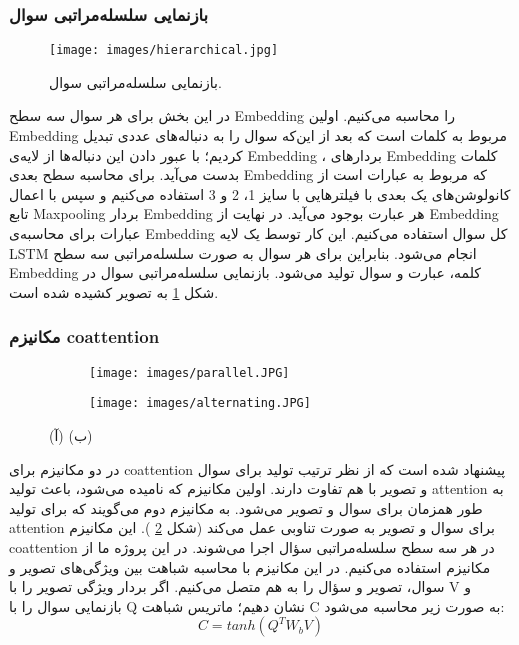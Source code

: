 {{		\subsubsection{بازنمایی سلسله‌مراتبی سوال}
		{
			\begin{figure}[h]
				\centering
				\texttt{[image: images/hierarchical.jpg]}
				\caption{بازنمایی سلسله‌مراتبی سوال.}
				\label{fig:4}
			\end{figure}
		
			در این بخش برای هر سوال سه سطح Embedding را محاسبه می‌کنیم. اولین Embedding مربوط به کلمات است که بعد از این‌که سوال را به دنباله‌های عددی تبدیل کردیم؛ با عبور دادن این دنباله‌ها از لایه‌ی Embedding ، بردارهای Embedding‌ کلمات بدست می‌آید. برای محاسبه سطح بعدی Embedding که مربوط به عبارات است از کانولوشن‌های یک بعدی با فیلترهایی با سایز 1، 2 و 3 استفاده می‌کنیم و سپس با اعمال تابع Maxpooling بردار Embedding هر عبارت بوجود می‌آید. در نهایت از Embedding عبارات  برای محاسبه‌ی Embedding  کل سوال استفاده می‌کنیم. این کار توسط یک لایه LSTM انجام می‌شود. بنابراین  برای هر سوال به صورت سلسله‌مراتبی سه سطح Embedding کلمه، عبارت و سوال تولید می‌شود. بازنمایی سلسله‌مراتبی سوال در شکل
			\ref{fig:4}
			 به تصویر کشیده شده است.
		}
		\subsubsection{مکانیزم coattention}
		{
			\begin{figure}
				\centering
				\begin{subfigure}[b]{0.4\textwidth}
					\centering
					\texttt{[image: images/parallel.JPG]}
					\caption{}
				\end{subfigure}%
				\begin{subfigure}[b]{0.42\textwidth}
					\centering
					\texttt{[image: images/alternating.JPG]}
					\caption{}
				\end{subfigure}%
				\caption
				{
					(آ) 
					(ب)
				}
				\label{fig:5}
			\end{figure}
			در 
			\cite{}
			 دو مکانیزم برای coattention پیشنهاد شده است که از نظر ترتیب تولید 
			 برای سوال و تصویر با هم تفاوت دارند. اولین مکانیزم که
			 نامیده می‌شود، باعث تولید attention به طور همزمان برای سوال و تصویر می‌شود. به مکانیزم دوم
			 می‌گویند که برای تولید attention‌ برای سوال و تصویر به صورت تناوبی عمل می‌کند (شکل 
			\ref{fig:5}
			 ). این مکانیزم coattention در هر سه سطح سلسله‌مراتبی سؤال اجرا می‌شوند.  در این پروژه ما از مکانیزم 
			 استفاده می‌کنیم. در این مکانیزم با محاسبه شباهت بین ویژگی‌های تصویر و سوال، تصویر و سؤال را به هم متصل می‌کنیم. اگر بردار ویژگی تصویر را با V و بازنمایی سوال را با Q نشان دهیم؛ ماتریس شباهت C 
			 به صورت زیر محاسبه می‌شود:
			 \begin{equation}
			 	C = tanh(Q^TW_bV)
			 \end{equation}
			 
}}}
